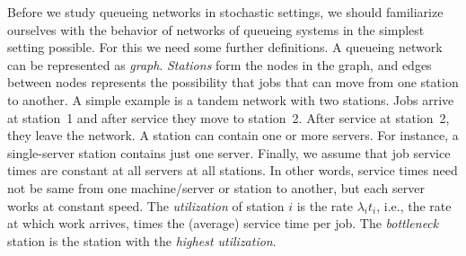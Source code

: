 Before we study queueing networks in stochastic settings, we should
familiarize ourselves with the behavior of networks of queueing
systems in the simplest setting possible.  For this we need some
further definitions. A queueing network can be represented as
\emph{graph}. \emph{Stations} form the nodes in the graph, and edges
between nodes represents the possibility that jobs that can move from
one station to another. A simple example is a tandem network with two
stations. Jobs arrive at station~1 and after service they move to
station~2. After service at station~2, they leave the network. A
station can contain one or more servers. For instance, a single-server
station contains just one server. Finally, we assume that job service
times are constant at all servers at all stations. In other words,
service times need not be same from one machine/server or station
to another, but each server works at constant speed.  The
\emph{utilization} of station $i$ is the rate $\lambda_i t_i$, i.e.,
the rate at which work arrives, times the (average) service time per
job. The \emph{bottleneck} station is the station with the
\emph{highest utilization}.

